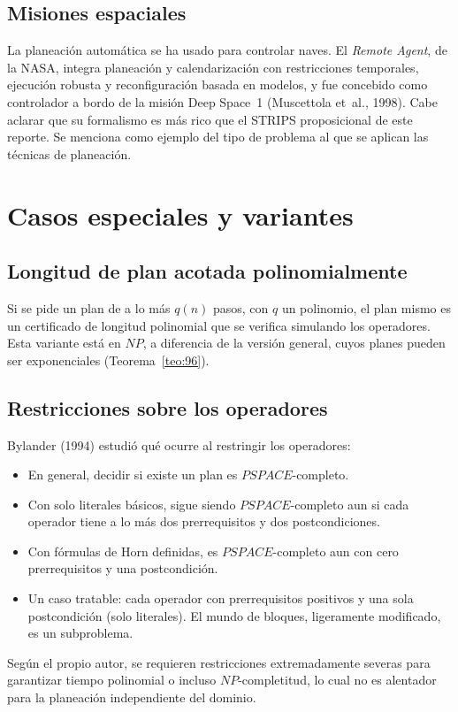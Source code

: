 \documentclass[11pt,letterpaper]{article}
\theoremstyle{plain}
\theoremstyle{definition}
\theoremstyle{remark}
\newcommand{\nombreMat}[1]{\ensuremath{\text{\fontencoding{OT1}\fontfamily{cmss}\upshape\selectfont #1}}}
\newcommand{\PSPACE}{\nombreMat{PSPACE}}
\newcommand{\NP}{\nombreMat{NP}}
\newcommand{\coNP}{\nombreMat{co-NP}}
\def\PSPACE{PSPACE}\def\NP{NP}\def\coNP{co-NP}%
\begin{document}
\subsection{Misiones espaciales}
La planeación automática se ha usado para controlar naves. El \emph{Remote Agent}, de la NASA, integra planeación y calendarización con restricciones temporales, ejecución robusta y reconfiguración basada en modelos, y fue concebido como controlador a bordo de la misión Deep Space~1 (Muscettola et~al., 1998).
Cabe aclarar que su formalismo es más rico que el STRIPS proposicional de este reporte. Se menciona como ejemplo del tipo de problema al que se aplican las técnicas de planeación.

\section{Casos especiales y variantes}

\subsection{Longitud de plan acotada polinomialmente}
Si se pide un plan de a lo más $q(n)$ pasos, con $q$ un polinomio, el plan mismo es un certificado de longitud polinomial que se verifica simulando los operadores. Esta variante está en $\NP$, a diferencia de la versión general, cuyos planes pueden ser exponenciales (Teorema~\ref{teo:96}).

\subsection{Restricciones sobre los operadores}
Bylander (1994) estudió qué ocurre al restringir los operadores:
\begin{itemize}[leftmargin=1.5em,itemsep=1pt]
\item En general, decidir si existe un plan es $\PSPACE$-completo.
\item Con solo literales básicos, sigue siendo $\PSPACE$-completo aun si cada operador tiene a lo más dos prerrequisitos y dos postcondiciones.
\item Con fórmulas de Horn definidas, es $\PSPACE$-completo aun con cero prerrequisitos y una postcondición.
\item Un caso tratable: cada operador con prerrequisitos positivos y una sola postcondición (solo literales). El mundo de bloques, ligeramente modificado, es un subproblema.
\end{itemize}
Según el propio autor, se requieren restricciones extremadamente severas para garantizar tiempo polinomial o incluso $\NP$-completitud, lo cual no es alentador para la planeación independiente del dominio.
\end{document}
